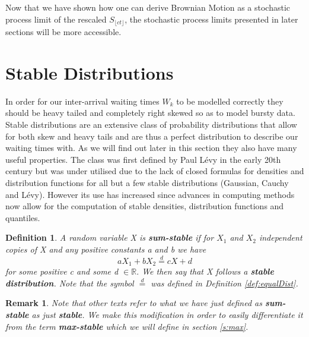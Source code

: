 \documentclass[honours,12pt,twoside, openright]{unswthesis}
\newcommand{\R}{\mathbb{R}}
\newcommand{\1}{\mathbf 1}
\newtheorem{definition}[equation]{Definition}
\newtheorem{remark}[equation]{Remark}
\numberwithin{equation}{section}
\theoremstyle{definition}
\theoremstyle{remark}
\begin{document}



Now that we have shown how one can derive Brownian Motion as a stochastic process limit of the rescaled $S_{\lfloor ct\rfloor}$, the stochastic process limits presented in later sections will be more accessible.


\section{Stable Distributions}
In order for our inter-arrival waiting times $W_k$ to be modelled correctly they should be heavy tailed and completely right skewed so as to model bursty data.
Stable distributions are an extensive class of probability distributions that allow for both skew and heavy tails and are thus a perfect distribution to describe our waiting times with. As we will find out later in this section they also have many useful properties. The class was first defined by Paul L\'{e}vy in the early 20th century but was under utilised due to the lack of closed formulas for densities and distribution functions for all but a few stable distributions (Gaussian, Cauchy and L\'{e}vy). However its use has increased since advances in computing methods now allow for the computation of stable densities, distribution functions and quantiles.\\
\begin{definition}\cite{Nolan2015}
A random variable X is \textbf{sum-stable} if for $X_1$ and $X_2$ independent copies of X and any positive constants a and b we have
\[
	aX_1+bX_2\overset{d}{=}cX+d
\]
for some positive c and some d $\in\R.$ We then say that X follows a \textbf{stable distribution}. Note that the symbol $\overset{d}{=}$ was defined in Definition \ref{def:equalDist}.\\
\end{definition}
\begin{remark}
Note that other texts refer to what we have just defined as \textbf{sum-stable} as just \textbf{stable}. We make this modification in order to easily differentiate it from the term \textbf{max-stable} which we will define in section \ref{s:max}.\\
\end{remark}
\end{document}
